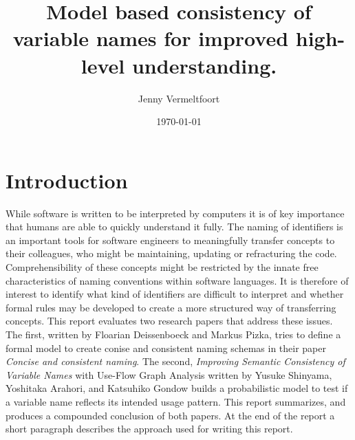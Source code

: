 \documentclass[a4paper,12pt]{article}
\begin{document}
\title{Model based consistency of variable names for improved high-level understanding.}
\author{Jenny Vermeltfoort}
\date{\today}
\maketitle

\section{Introduction}
While software is written to be interpreted by computers it is of key importance that humans are able to quickly understand it fully. The naming of identifiers is an important tools for software engineers to meaningfully transfer concepts to their colleagues, who might be maintaining, updating or refracturing the code. Comprehensibility of these concepts might be restricted by the innate free characteristics of naming conventions within software languages. It is therefore of interest to identify what kind of identifiers are difficult to interpret and whether formal rules may be developed to create a more structured way of transferring concepts.
This report evaluates two research papers that address these issues. The first, written by Floarian Deissenboeck and Markus Pizka, tries to define a formal model to create conise and consistent naming schemas in their paper \textit{Concise and consistent naming}. The second, \textit{Improving Semantic Consistency of Variable Names} with Use-Flow Graph Analysis written by Yusuke Shinyama, Yoshitaka Arahori, and Katsuhiko Gondow builds a probabilistic model to test if a variable name reflects its intended usage pattern. This report summarizes, and produces a compounded conclusion of both papers. At the end of the report a short paragraph describes the approach used for writing this report.

\newpage
\end{document}
